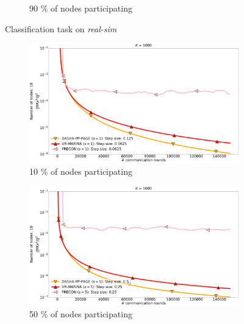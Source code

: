 \documentclass[10pt]{article}
\begin{document}
\begin{figure}[H]
\begin{subfigure}{.33\textwidth}
        \caption{90 \% of nodes participating}
    \end{subfigure}
\caption{Classification task on \textit{real-sim}}
\label{fig:finite-sum-real-sim}
\end{figure}

\begin{figure}[H]
    \begin{subfigure}{.33\textwidth}
        \includegraphics[width=\textwidth]{neurips_2022_finite_sum_mnist_nof_1000_numnodes_10_more_probs_batch_size_100_split_by_labels_logistic_frecon_number_of_workers_1.pdf}
        \caption{10 \% of nodes participating}
    \end{subfigure}
    \begin{subfigure}{.33\textwidth}
        \includegraphics[width=\textwidth]{neurips_2022_finite_sum_mnist_nof_1000_numnodes_10_more_probs_batch_size_100_split_by_labels_logistic_frecon_number_of_workers_5.pdf}
        \caption{50 \% of nodes participating}
    \end{subfigure}
    \begin{subfigure}{.33\textwidth}

\end{subfigure}
\end{figure}
\end{document}

